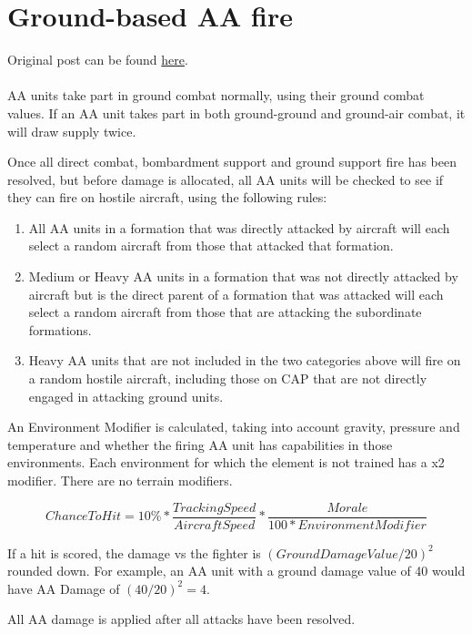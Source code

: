 \documentclass[../../Aurora C# unofficial manual.tex]{subfiles}
\begin{document}
	\section{Ground-based AA fire}
	Original post can be found
	\href{http://aurora2.pentarch.org/index.php?topic=8495.msg109914#msg109914}{here}.
	\\\\
	
	AA units take part in ground combat normally, using their ground combat values. If an AA unit takes part in both ground-ground and ground-air combat, it will draw supply twice.
	
	Once all direct combat, bombardment support and ground support fire has been resolved, but before damage is allocated, all AA units will be checked to see if they can fire on hostile aircraft, using the following rules:
	\begin{enumerate}
		\item All AA units in a formation that was directly attacked by aircraft will each select a random aircraft from those that attacked that formation.
		\item Medium or Heavy AA units in a formation that was not directly attacked by aircraft but is the direct parent of a formation that was attacked will each select a random aircraft from those that are attacking the subordinate formations.
		\item Heavy AA units that are not included in the two categories above will fire on a random hostile aircraft, including those on CAP that are not directly engaged in attacking ground units.
	\end{enumerate}
	
	An Environment Modifier is calculated, taking into account gravity, pressure and temperature and whether the firing AA unit has capabilities in those environments. Each environment for which the element is not trained has a x2 modifier. There are no terrain modifiers.
	
	\[ Chance To Hit = 10\% * \frac{Tracking Speed}{Aircraft Speed} * \frac{Morale}{100 * Environment Modifier} \]
	
	If a hit is scored, the damage vs the fighter is \( (Ground Damage Value / 20)^{2} \) rounded down. For example, an AA unit with a ground damage value of 40 would have AA Damage of \( (40 / 20)^{2} = 4 \).
	
	All AA damage is applied after all attacks have been resolved.
\end{document}
